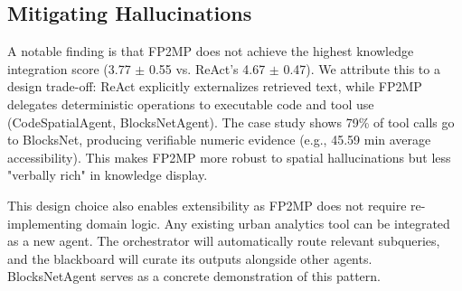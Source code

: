 \subsection{Mitigating Hallucinations}

A notable finding is that FP2MP does not achieve the highest knowledge integration score (3.77 $\pm$ 0.55 vs. ReAct’s 4.67 $\pm$ 0.47).
We attribute this to a design trade-off: ReAct explicitly externalizes retrieved text, while FP2MP delegates deterministic operations to executable code and tool use (CodeSpatialAgent, BlocksNetAgent).
The case study shows 79\% of tool calls go to BlocksNet, producing verifiable numeric evidence (e.g., 45.59 min average accessibility).
This makes FP2MP more robust to spatial hallucinations but less "verbally rich" in knowledge display.

This design choice also enables extensibility as FP2MP does not require re-implementing domain logic.
Any existing urban analytics tool can be integrated as a new agent.
The orchestrator will automatically route relevant subqueries, and the blackboard will curate its outputs alongside other agents.
BlocksNetAgent serves as a concrete demonstration of this pattern.